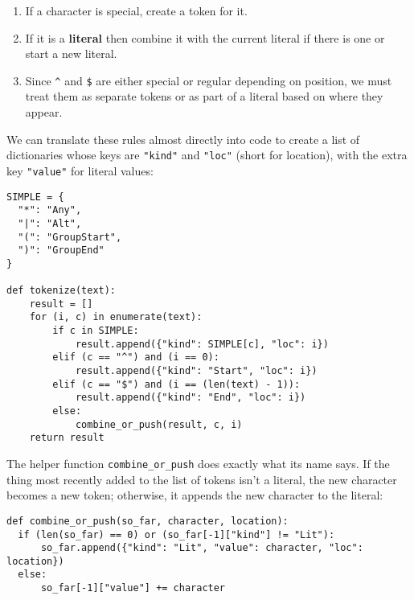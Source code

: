 \documentclass{scrbook}
\newcommand{\glossref}[1]{\textbf{#1}}
\begin{document}
\begin{enumerate}

\item 

If a character is special, create a token for it.



\item 

If it is a \glossref{literal} then
    combine it with the current literal if there is one
    or start a new literal.



\item 

Since \texttt{{\textasciicircum}} and \texttt{\$} are either special or regular depending on position,
    we must treat them as separate tokens or as part of a literal
    based on where they appear.



\end{enumerate}


We can translate these rules almost directly into code
to create a list of dictionaries whose keys are \texttt{"kind"} and \texttt{"loc"} (short for location),
with the extra key \texttt{"value"} for literal values:


\begin{lstlisting}[frame=single,frameround=tttt]
SIMPLE = {
  "*": "Any",
  "|": "Alt",
  "(": "GroupStart",
  ")": "GroupEnd"
}

def tokenize(text):
    result = []
    for (i, c) in enumerate(text):
        if c in SIMPLE:
            result.append({"kind": SIMPLE[c], "loc": i})
        elif (c == "^") and (i == 0):
            result.append({"kind": "Start", "loc": i})
        elif (c == "$") and (i == (len(text) - 1)):
            result.append({"kind": "End", "loc": i})
        else:
            combine_or_push(result, c, i)
    return result
\end{lstlisting}



The helper function \texttt{combine\_or\_push} does exactly what its name says.
If the thing most recently added to the list of tokens isn't a literal,
the new character becomes a new token;
otherwise,
it appends the new character to the literal:


\begin{lstlisting}[frame=single,frameround=tttt]
def combine_or_push(so_far, character, location):
  if (len(so_far) == 0) or (so_far[-1]["kind"] != "Lit"):
      so_far.append({"kind": "Lit", "value": character, "loc": location})
  else:
      so_far[-1]["value"] += character
\end{lstlisting}
\end{document}
